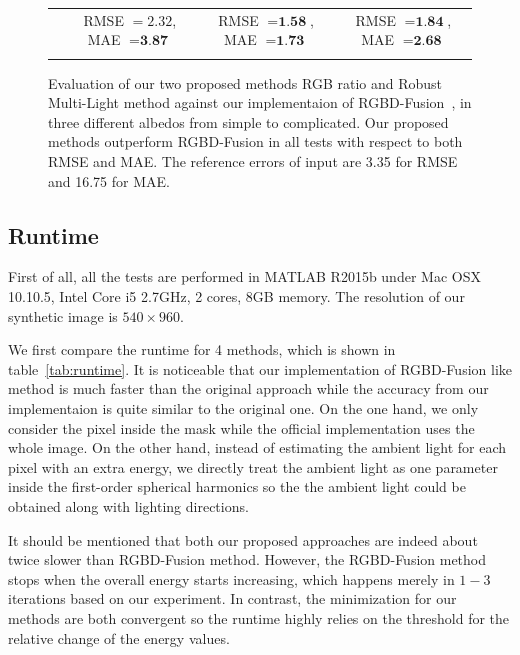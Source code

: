\begin{figure}
{\begin{tabular}{cccc}
& {\small RMSE $= 2.32$, MAE $=\textbf{3.87}$} & {\small RMSE $= \textbf{1.58}$, MAE $=\textbf{1.73}$} & {\small RMSE $= \textbf{1.84}$, MAE $=\textbf{2.68}$} \\
 \\
  \end{tabular}
  }
  \caption{Evaluation of our two proposed methods RGB ratio and Robust Multi-Light method against our implementaion of RGBD-Fusion~\cite{or2015rgbd}, in three different albedos from simple to complicated. Our proposed methods outperform RGBD-Fusion in all tests with respect to both RMSE and MAE. The reference errors of input are 3.35 for RMSE and 16.75 for MAE.}
  \label{fig:result_syn_comp}
\end{figure}


\subsection{Runtime}
First of all, all the tests are performed in MATLAB R2015b under Mac OSX 10.10.5, Intel Core i5 2.7GHz, 2 cores, 8GB memory. 
The resolution of our synthetic image is $540\times 960$.

We first compare the runtime for 4 methods, which is shown in table~\ref{tab:runtime}.
It is noticeable that our implementation of RGBD-Fusion like method is much faster than the original approach while the accuracy from our implementaion is quite similar to the original one.
On the one hand, we only consider the pixel inside the mask while the official implementation uses the whole image.
On the other hand, instead of estimating the ambient light for each pixel with an extra energy, we directly treat the ambient light as one parameter inside the first-order spherical harmonics so the the ambient light could be obtained along with lighting directions.

It should be mentioned that both our proposed approaches are indeed about twice slower than RGBD-Fusion method. 
However, the RGBD-Fusion method stops when the overall energy starts increasing, which happens merely in $1-3$ iterations based on our experiment.  
In contrast, the minimization for our methods are both convergent so the runtime highly relies on the threshold for the relative change of the energy values.

